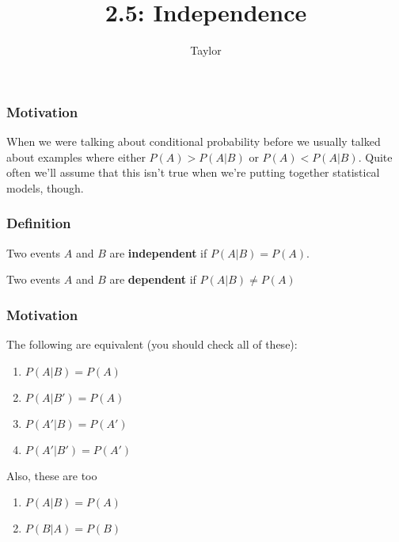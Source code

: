 \documentclass{beamer}
\title["2.5"]{2.5: Independence}
\author{Taylor}
\institute[UVA] 
{
University of Virginia \\
\medskip
\textit{} 
}
\date{}
\begin{document}

\begin{frame}
\titlepage 
\end{frame}

\begin{frame}
\frametitle{Motivation}

When we were talking about conditional probability before we usually talked about examples where either $P(A) > P(A|B)$ or $P(A) < P(A|B)$. Quite often we'll assume that this isn't true when we're putting together statistical models, though. 

\end{frame}


\begin{frame}
\frametitle{Definition}

Two events $A$ and $B$ are \textbf{independent} if $P(A|B) = P(A)$.
\newline

Two events $A$ and $B$ are \textbf{dependent} if $P(A|B) \neq P(A)$

\end{frame}



\begin{frame}
\frametitle{Motivation}

The following are equivalent (you should check all of these):
\begin{enumerate}
\item $P(A|B) = P(A)$
\item $P(A|B') = P(A)$
\item $P(A'|B) = P(A')$
\item $P(A'|B') = P(A')$
\end{enumerate}
\pause

Also, these are too
\begin{enumerate}
\item $P(A|B) = P(A)$
\item $P(B|A) = P(B)$
\end{enumerate}

\end{frame}
\end{document}
